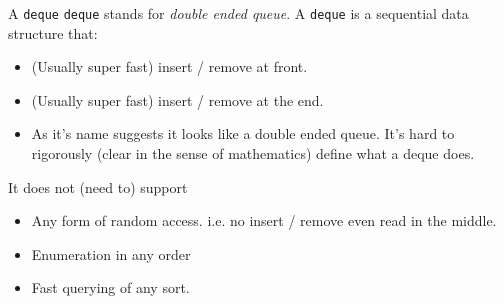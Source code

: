 \begin{frame}{A \texttt{deque}}
\texttt{deque} stands for \textit{double ended queue}. A \texttt{deque} is a sequential data structure that:
\begin{itemize}
	\item (Usually super fast) insert / remove at front.
	\item (Usually super fast) insert / remove at the end.
	\item As it's name suggests it looks like a double ended queue. It's hard to rigorously (clear in the sense of mathematics) define what a deque does. 
\end{itemize}
It does not (need to) support
\begin{itemize}
	\item Any form of random access. i.e. no insert / remove even read in the middle.
	\item Enumeration in any order
	\item Fast querying of any sort. 
\end{itemize}
\end{frame}

